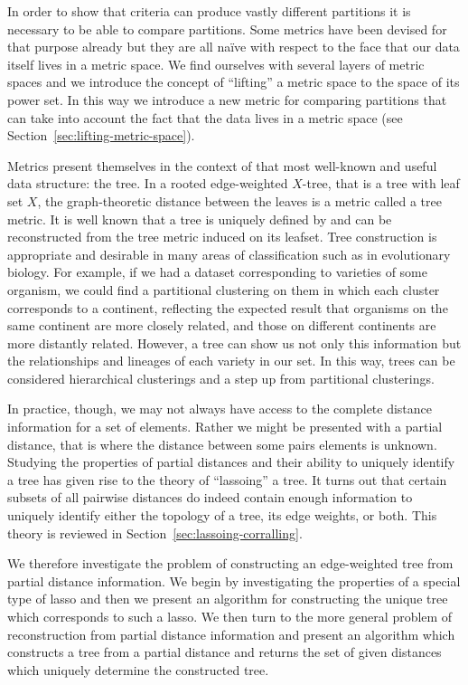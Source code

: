 In order to show that criteria can produce vastly different partitions it is
necessary to be able to compare partitions.  Some metrics have been devised
for that purpose already but they are all naïve with respect to the face that
our data itself lives in a metric space.  We find ourselves with several
layers of metric spaces and we introduce the concept of ``lifting'' a metric
space to the space of its power set.  In this way we introduce a new metric
for comparing partitions that can take into account the fact that the data
lives in a metric space (see Section~\ref{sec:lifting-metric-space}).

Metrics present themselves in the context of that most well-known and useful
data structure: the tree.  In a rooted edge-weighted $X$-tree, that is a tree
with leaf set $X$, the graph-theoretic distance between the leaves is a metric
called a tree metric.  It is well known that a tree is uniquely defined by and
can be reconstructed from the tree metric induced on its leafset.  Tree
construction is appropriate and desirable in many areas of classification such
as in evolutionary biology.  For example, if we had a dataset corresponding to
varieties of some organism, we could find a partitional clustering on them in
which each cluster corresponds to a continent, reflecting the expected result
that organisms on the same continent are more closely related, and those on
different continents are more distantly related.  However, a tree can show us
not only this information but the relationships and lineages of each variety
in our set.  In this way, trees can be considered hierarchical clusterings and
a step up from partitional clusterings.

In practice, though, we may not always have access to the complete distance
information for a set of elements.  Rather we might be presented with a
partial distance, that is where the distance between some pairs elements is
unknown.  Studying the properties of partial distances and their ability to
uniquely identify a tree has given rise to the theory of ``lassoing'' a tree.
It turns out that certain subsets of all pairwise distances do indeed contain
enough information to uniquely identify either the topology of a tree, its
edge weights, or both.  This theory is reviewed in
Section~\ref{sec:lassoing-corralling}.

We therefore investigate the problem of constructing an edge-weighted tree
from partial distance information.  We begin by investigating the properties
of a special type of lasso and then we present an algorithm for constructing
the unique tree which corresponds to such a lasso.  We then turn to the more
general problem of reconstruction from partial distance information and
present an algorithm which constructs a tree from a partial distance and
returns the set of given distances which uniquely determine the constructed
tree.

